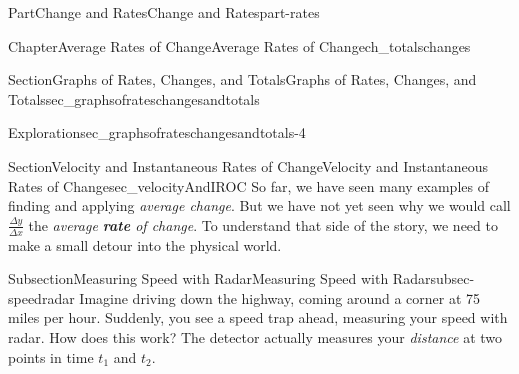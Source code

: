 \documentclass[oneside,10pt,]{tufte-book}
\newcommand{\terminology}[1]{\textbf{#1}}
\numberwithin{equation}{chapter}
\begin{document}
\begin{partptx}{Part}{Change and Rates}{}{Change and Rates}{}{}{part-rates}
\begin{chapterptx}{Chapter}{Average Rates of Change}{}{Average Rates of Change}{}{}{ch_totalschanges}
\begin{sectionptx}{Section}{Graphs of Rates, Changes, and Totals}{}{Graphs of Rates, Changes, and Totals}{}{}{sec_graphsofrateschangesandtotals}
\begin{exploration}{Exploration}{}{sec_graphsofrateschangesandtotals-4}
\begin{enumerate}[font=\bfseries,label=(\alph*),ref=\alph*]
\begin{image}{0.2}{0.6}{0.2}{}
{\begin{tikzpicture}[xscale=\xscale,yscale=\yscale]
\end{tikzpicture}
}%
\end{image}%
\end{enumerate}%
\end{exploration}%
\end{sectionptx}
%
%
\typeout{************************************************}
\typeout{************************************************}
%
\begin{sectionptx}{Section}{Velocity and Instantaneous Rates of Change}{}{Velocity and Instantaneous Rates of Change}{}{}{sec_velocityAndIROC}
So far, we have seen many examples of finding and applying \emph{average change}. But we have not yet seen why we would call \(\frac{\Delta y}{\Delta x}\) the \emph{average \terminology{rate} of change}. To understand that side of the story, we need to make a small detour into the physical world.%
%
%
\typeout{************************************************}
\typeout{************************************************}
%
\begin{subsectionptx}{Subsection}{Measuring Speed with Radar}{}{Measuring Speed with Radar}{}{}{subsec-speedradar}
Imagine driving down the highway, coming around a corner at 75 miles per hour. Suddenly, you see a speed trap ahead, measuring your speed with radar. How does this work? The detector actually measures your \emph{distance} at two points in time \(t_1\) and \(t_2\).%
\begin{image}{0}{1}{0}{}%
\end{image}
\end{subsectionptx}
\end{sectionptx}
\end{chapterptx}
\end{partptx}
\end{document}
